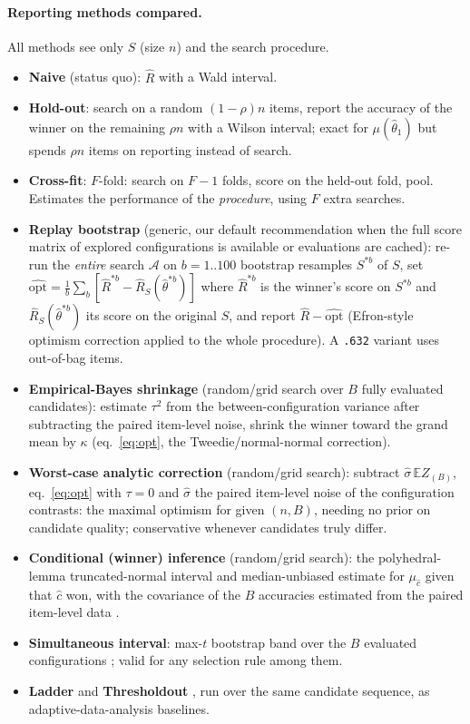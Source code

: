 \paragraph{Reporting methods compared.}
All methods see only $S$ (size $n$) and the search procedure.
\begin{itemize}\setlength\itemsep{0pt}
\item \textbf{Naive} (status quo): $\hat R$ with a Wald interval.
\item \textbf{Hold-out}: search on a random $(1-\rho)n$ items, report the accuracy of the winner on the remaining $\rho n$ with a Wilson interval; exact for $\mu(\hat\theta_{1})$ but spends $\rho n$ items on reporting instead of search.
\item \textbf{Cross-fit}: $F$-fold: search on $F\!-\!1$ folds, score on the held-out fold, pool. Estimates the performance of the \emph{procedure}, using $F$ extra searches.
\item \textbf{Replay bootstrap} (generic, our default recommendation when the full score matrix of explored configurations is available or evaluations are cached): re-run the \emph{entire} search $\mathcal{A}$ on $b=1..100$ bootstrap resamples $S^{*b}$ of $S$, set $\widehat{\mathrm{opt}}=\frac1b\sum_b[\hat R^{*b}-\hat R_S(\hat\theta^{*b})]$ where $\hat R^{*b}$ is the winner's score on $S^{*b}$ and $\hat R_S(\hat\theta^{*b})$ its score on the original $S$, and report $\hat R-\widehat{\mathrm{opt}}$ (Efron-style optimism correction applied to the whole procedure). A \texttt{.632} variant uses out-of-bag items.
\item \textbf{Empirical-Bayes shrinkage} (random/grid search over $B$ fully evaluated candidates): estimate $\tau^2$ from the between-configuration variance after subtracting the paired item-level noise, shrink the winner toward the grand mean by $\kappa$ (eq.~\ref{eq:opt}, the Tweedie/normal-normal correction).
\item \textbf{Worst-case analytic correction} (random/grid search): subtract $\hat\sigma\,\mathbb{E}Z_{(B)}$, eq.~\eqref{eq:opt} with $\tau{=}0$ and $\hat\sigma$ the paired item-level noise of the configuration contrasts: the maximal optimism for given $(n,B)$, needing no prior on candidate quality; conservative whenever candidates truly differ.
\item \textbf{Conditional (winner) inference} (random/grid search): the polyhedral-lemma truncated-normal interval and median-unbiased estimate for $\mu_{\hat c}$ given that $\hat c$ won, with the covariance of the $B$ accuracies estimated from the paired item-level data \citep{lee2016exact,andrews2024inference}.
\item \textbf{Simultaneous interval}: max-$t$ bootstrap band over the $B$ evaluated configurations \citep{chernozhukov2013gaussian}; valid for any selection rule among them.
\item \textbf{Ladder} \citep{blum2015ladder} and \textbf{Thresholdout} \citep{dwork2015generalization}, run over the same candidate sequence, as adaptive-data-analysis baselines.
\end{itemize}
